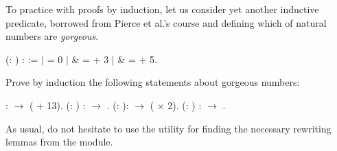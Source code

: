 To practice with proofs by induction, let us consider yet another
inductive predicate, borrowed from Pierce et al.'s course and defining
which of natural numbers are \textit{gorgeous}.  




\begin{coqdoccode}
\coqdocemptyline
\coqdocnoindent
{}  (: ) :  :=\coqdoceol
\coqdocnoindent
\ensuremath{|}    = 0\coqdoceol
\coqdocnoindent
\ensuremath{|}      \&  =  + 3\coqdoceol
\coqdocnoindent
\ensuremath{|}      \&  =  + 5.\coqdoceol
\coqdocemptyline
\coqdocemptyline
\end{coqdoccode}


\begin{exercise}\label{ex:gb}


Prove by induction the following statements about gorgeous numbers:


\begin{coqdoccode}
\coqdocemptyline
\coqdocnoindent
{}  :   \ensuremath{\rightarrow}  ( + 13).\coqdoceol
\coqdocemptyline
\coqdocnoindent
{}  (: ) :   \ensuremath{\rightarrow}  .\coqdoceol
\coqdocemptyline
\coqdocnoindent
{}  (: ):   \ensuremath{\rightarrow}  ( \ensuremath{\times} 2).\coqdoceol
\coqdocemptyline
\coqdocnoindent
{}  (: ) :   \ensuremath{\rightarrow}  .\coqdoceol
\coqdocemptyline
\end{coqdoccode}
\noindent
As usual, do not hesitate to use the  utility for finding the
necessary rewriting lemmas from the  module.


\end{exercise}






